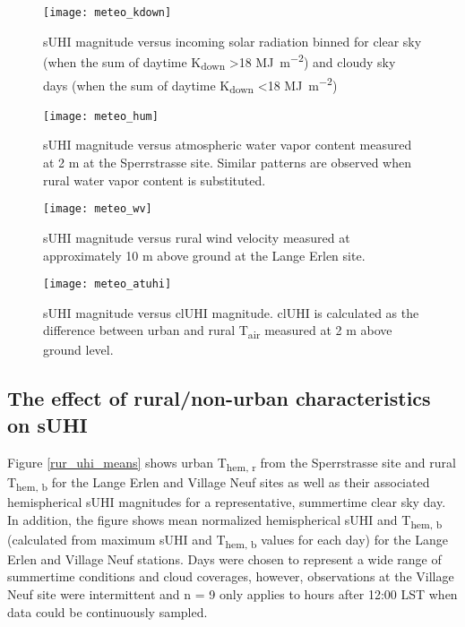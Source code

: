 \begin{bibunit}
\begin{figure}[H]
	\centering
	\texttt{[image: meteo\_kdown]}
	\caption{sUHI magnitude versus incoming solar radiation binned for clear sky (when the sum of daytime K\textsubscript{down} \textgreater 18 \si{\mega\joule\per\meter\squared}) and cloudy sky days (when the sum of daytime K\textsubscript{down} \textless 18 \si{\mega\joule\per\meter\squared})}
	\label{meteo_kdown}
\end{figure}

\begin{figure}[H]
	\centering
	\texttt{[image: meteo\_hum]}
	\caption{sUHI magnitude versus atmospheric water vapor content measured at 2 \si{\meter} at the Sperrstrasse site. Similar patterns are observed when rural water vapor content is substituted.}
	\label{meteo_hum}
\end{figure}

\begin{figure}[H]
	\centering
	\texttt{[image: meteo\_wv]}
	\caption{sUHI magnitude versus rural wind velocity measured at approximately 10 \si{\meter} above ground at the Lange Erlen site.}
	\label{meteo_wv}
\end{figure}

\begin{figure}[H]
	\centering
	\texttt{[image: meteo\_atuhi]}
	\caption{sUHI magnitude versus clUHI magnitude. clUHI is calculated as the difference between urban and rural T\textsubscript{air} measured at 2 \si{\meter} above ground level.}
	\label{meteo_atuhi}
\end{figure}

\pagebreak

\subsection{The effect of rural/non-urban characteristics on sUHI}

Figure \ref{rur_uhi_means} shows urban T\textsubscript{hem, r} from the Sperrstrasse site and rural T\textsubscript{hem, b} for the Lange Erlen and Village Neuf sites as well as their associated hemispherical sUHI magnitudes for a representative, summertime clear sky day. In addition, the figure shows mean normalized hemispherical sUHI and T\textsubscript{hem, b} (calculated from maximum sUHI and T\textsubscript{hem, b} values for each day) for the Lange Erlen and Village Neuf stations. Days were chosen to represent a wide range of summertime conditions and cloud coverages, however, observations at the Village Neuf site were intermittent and n = 9 only applies to hours after 12:00 LST when data could be continuously sampled.


\end{bibunit}
